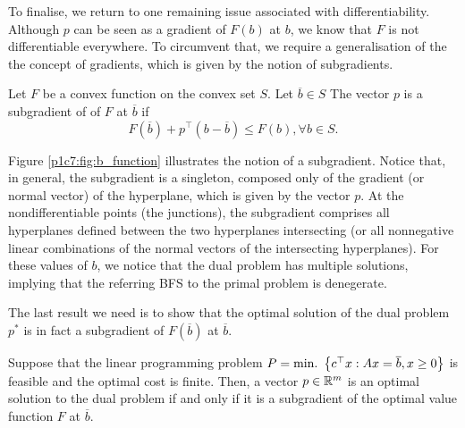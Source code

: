 To finalise, we return to one remaining issue associated with differentiability. Although $p$ can be seen as a gradient of $F(b)$ at $b$, we know that $F$ is not differentiable everywhere. To circumvent that, we require a generalisation of the the concept of gradients, which is given by the notion of subgradients. 

\begin{definition}
	Let $F$ be a convex function on the convex set $S$. Let $\overline{b} \in S$ The vector $p$ is a subgradient of of $F$ at $\overline{b}$ if
	\begin{equation}
		F(\overline{b}) + p^\top (b - \overline{b}) \le F(b), \forall b \in S.
	\end{equation}
\end{definition}

Figure \ref{p1c7:fig:b_function} illustrates the notion of a subgradient. Notice that, in general, the subgradient is a singleton, composed only of the gradient (or normal vector) of the hyperplane, which is given by the vector $p$. At the nondifferentiable points (the junctions), the subgradient comprises all hyperplanes defined between the two hyperplanes intersecting (or all nonnegative linear combinations of the normal vectors of the intersecting hyperplanes). For these values of $b$, we notice that the dual problem has multiple solutions, implying that the referring BFS to the primal problem is denegerate.   


The last result we need is to show that the optimal solution of the dual problem $p^*$ is in fact a subgradient of $F(\overline{b})$ at $\overline{b}$.

\begin{theorem}
	Suppose that the linear programming problem $P = \mathop{\text{min.~}} \left\{ c^\top x : Ax = \overline{b}, x \ge 0 \right \}$ is feasible and the optimal cost is finite. Then, a vector $p \in \mathbb{R}^m$ is an optimal solution to the dual problem if and only if it is a subgradient of the optimal value function $F$ at $\overline{b}$.
\end{theorem}

